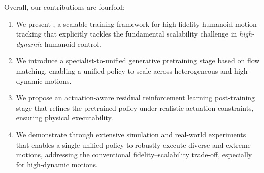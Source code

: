 Overall, our contributions are fourfold:
\begin{enumerate}[leftmargin=*,noitemsep,nolistsep,topsep=0pt,partopsep=0pt]
\item We present \model, a scalable training framework for high-fidelity humanoid
motion tracking that explicitly tackles the fundamental scalability challenge in
\emph{high-dynamic} humanoid control.
\item We introduce a specialist-to-unified generative pretraining stage based on flow matching, enabling a unified policy to scale across heterogeneous and high-dynamic motions.
\item We propose an actuation-aware residual reinforcement learning post-training stage that refines the pretrained policy under realistic actuation constraints, ensuring physical executability.
\item We demonstrate through extensive simulation and real-world experiments that \model enables a single unified policy to robustly execute diverse and extreme motions, addressing the conventional fidelity--scalability trade-off, especially for high-dynamic motions.
\end{enumerate}

